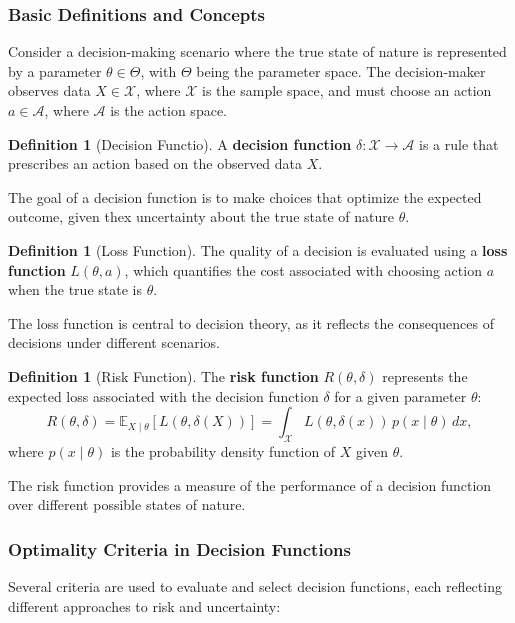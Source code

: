 \documentclass[magisterska, english]{pwr_wmat_praca_dyplomowa}
\theoremstyle{plain}
\numberwithin{theorem}{chapter}
\theoremstyle{definition}
\numberwithin{theorem}{chapter}
\newtheorem{definition}[theorem]{Definition}
\begin{document}
\subsubsection{Basic Definitions and Concepts}

Consider a decision-making scenario where the true state of nature is represented by a parameter \( \theta \in \Theta \), with \( \Theta \) being the parameter space. The decision-maker observes data \( X \in \mathcal{X} \), where \( \mathcal{X} \) is the sample space, and must choose an action \( a \in \mathcal{A} \), where \( \mathcal{A} \) is the action space.
\begin{definition}[Decision Functio]
	A \textbf{decision function} \( \delta: \mathcal{X} \rightarrow \mathcal{A} \) is a rule that prescribes an action based on the observed data \( X \). 
\end{definition}
The goal of a decision function is to make choices that optimize the expected outcome, given thex uncertainty about the true state of nature \( \theta \).

\begin{definition}[Loss Function]
	The quality of a decision is evaluated using a \textbf{loss function} \( L(\theta, a) \), which quantifies the cost associated with choosing action \( a \) when the true state is \( \theta \).
\end{definition}
The loss function is central to decision theory, as it reflects the consequences of decisions under different scenarios.

\begin{definition}[Risk Function]
	The \textbf{risk function} \( R(\theta, \delta) \) represents the expected loss associated with the decision function \( \delta \) for a given parameter \( \theta \):
	\[
	R(\theta, \delta) = \mathbb{E}_{X \mid \theta}[L(\theta, \delta(X))] = \int_{\mathcal{X}} L(\theta, \delta(x)) \, p(x \mid \theta) \, dx,
	\]
	where \( p(x \mid \theta) \) is the probability density function of \( X \) given \( \theta \). 
\end{definition}
The risk function provides a measure of the performance of a decision function over different possible states of nature.

\subsubsection{Optimality Criteria in Decision Functions}

Several criteria are used to evaluate and select decision functions, each reflecting different approaches to risk and uncertainty:
\end{document}
